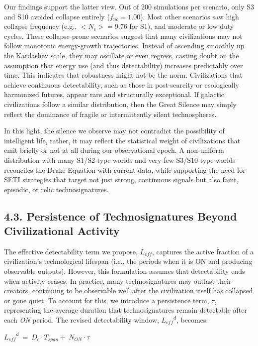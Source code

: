 Our findings support the latter view. Out of 200 simulations per scenario, only S3 and S10 avoided collapse entirely (\(f_{nc} = 1.00\)). Most other scenarios saw high collapse frequency (e.g., \({< N}_{c} > = 9.76\) for S1), and moderate or low duty cycles. These collapse-prone scenarios suggest that many civilizations may not follow monotonic energy-growth trajectories. Instead of ascending smoothly up the Kardashev scale, they may oscillate or even regress, casting doubt on the assumption that energy use (and thus detectability) increases predictably over time. This indicates that robustness might not be the norm. Civilizations that achieve continuous detectability, such as those in post-scarcity or ecologically harmonized futures, appear rare and structurally exceptional. If galactic civilizations follow a similar distribution, then the Great Silence may simply reflect the dominance of fragile or intermittently silent technospheres.

In this light, the silence we observe may not contradict the possibility of intelligent life, rather, it may reflect the statistical weight of civilizations that emit briefly or not at all during our observational epoch. A non-uniform distribution with many S1/S2-type worlds and very few S3/S10-type worlds reconciles the Drake Equation with current data, while supporting the need for SETI strategies that target not just strong, continuous signals but also faint, episodic, or relic technosignatures.

\subsection{4.3. Persistence of Technosignatures Beyond Civilizational Activity}\label{persistence-of-technosignatures-beyond-civilizational-activity}

The effective detectability term we propose, \(L_{eff}\), captures the active fraction of a civilization's technological lifespan (i.e., the periods when it is ON and producing observable outputs). However, this formulation assumes that detectability ends when activity ceases. In practice, many technosignatures may outlast their creators, continuing to be observable well after the civilization itself has collapsed or gone quiet. To account for this, we introduce a persistence term, \(\tau\), representing the average duration that technosignatures remain detectable after each \emph{ON} period. The revised detectability window, \({L_{eff}}^{d}\), becomes:

\({L_{eff}}^{d}\  = \ D_{c} \cdot T_{span} + \ N_{ON} \cdot \tau\)


